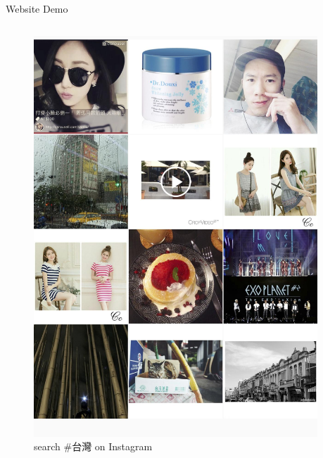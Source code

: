 \documentclass[final,hyperref={pdfpagelabels=false}]{beamer}
\begin{document}
\begin{frame}[t]
\begin{columns}[t]
\begin{column}{.465\textwidth}
\begin{block}{Website Demo}
\begin{columns}
\begin{column}{.5\textwidth}
\begin{figure}
\includegraphics[width=0.75\linewidth]{before}
\caption{search \#台灣 on Instagram}
\end{figure}

\end{column}

\begin{column}{.5\textwidth}


\end{column}
\end{columns}
\end{block}
\end{column}
\end{columns}
\end{frame}
\end{document}
